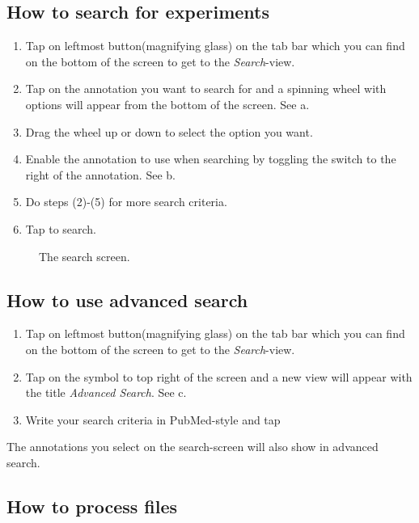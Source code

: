 \subsection{How to search for experiments}

\begin{enumerate}
\item Tap on leftmost button(magnifying glass) on the tab bar which you can find on the bottom of the screen to get to the \emph{Search}-view.
\item Tap on the annotation you want to search for and a spinning wheel with options will appear from the bottom of the screen. See a.
\item Drag the wheel up or down to select the option you want.
\item Enable the annotation to use when searching by toggling the switch to the right of the annotation. See b.
\item Do steps (2)-(5) for more search criteria.
\item Tap  to search.
\end{enumerate}

\begin{figure}[ht]
\caption{The search screen.}
\label{fig:ios_search}
\end{figure}
\FloatBarrier

\subsection{How to use advanced search}

\begin{enumerate}
\item Tap on leftmost button(magnifying glass) on the tab bar which you can find on the bottom of the screen to get to the \emph{Search}-view.
\item Tap on the symbol to top right of the screen and a new view will appear with the title \emph{Advanced Search}. See c.
\item Write your search criteria in PubMed-style and tap 
\end{enumerate}
The annotations you select on the search-screen will also show in advanced search.

\subsection{How to process files}


